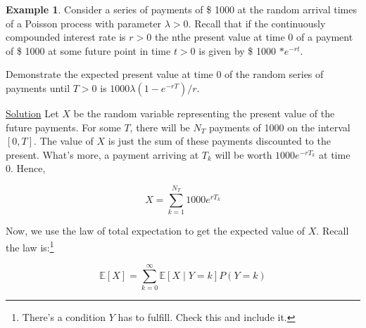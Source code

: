 \documentclass[12pt]{article}
\theoremstyle{definition}
\newtheorem{example}{Example}[section]
\begin{document}
\begin{example}
  Consider a series of payments of \$ 1000 at the random arrival times of a Poisson process with parameter $\lambda > 0$. Recall that if the continuously compounded interest rate is $r > 0$ the nthe present value at time 0 of a payment of \$ 1000 at some future point in time $t > 0$ is given by \$ 1000 $* e^{-rt}$.

  Demonstrate the expected present value at time 0 of the random series of payments until $T > 0$ is $1000 \lambda (1-e^{-rT}) /r $.

  \underline{Solution} Let $X$ be the random variable representing the present value of the future payments. For some $T$, there will be $N_T$ payments of 1000 on the interval $[0,T]$. The value of $X$ is just the sum of these payments discounted to the present. What's more, a payment arriving at $T_k$ will be worth $1000 e^{-rT_k}$ at time 0. Hence,

  $$
  X = \sum_{k=1}^{N_T} 1000 e^{rT_k}
  $$

  Now, we use the law of total expectation to get the expected value of $X$. Recall the law is:\footnote{There's a condition $Y$ has to fulfill. Check this and include it. }

  $$
\mathbb{E}[X] = \sum_{k=0}^{\infty} \mathbb{E}[ X \mid Y = k] P(Y = k)
  $$


\end{example}
\end{document}
